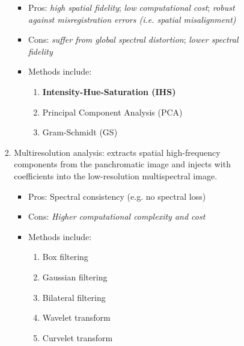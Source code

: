 \begin{itemize}
\begin{itemize}
\begin{itemize}
\begin{enumerate}
                                \begin{itemize}
                                    \item Pros: \textit{high spatial fidelity}; \textit{low computational cost}; \textit{robust against misregistration errors (i.e. spatial misalignment)}
                                    \item Cons: \textit{suffer from global spectral distortion}; \textit{lower spectral fidelity}
                                    \item Methods include:
                                    \begin{enumerate}
                                        \item \textbf{Intensity-Hue-Saturation (IHS)}
                                        \item Principal Component Analysis (PCA)
                                        \item Gram-Schmidt (GS)
                                    \end{enumerate}
                                \end{itemize}
                            \item Multiresolution analysis: extracts spatial high-frequency components from the panchromatic image and injects with coefficients into the low-resolution multispectral image.
                                \begin{itemize}
                                    \item Pros: Spectral consistency (e.g. no spectral loss)
                                    \item Cons: \textit{Higher computational complexity and cost}
                                    \item Methods include:
                                    \begin{enumerate}
                                        \item Box filtering
                                        \item Gaussian filtering
                                        \item Bilateral filtering
                                        \item Wavelet transform
                                        \item Curvelet transform
                                    \end{enumerate}

\end{itemize}
\end{enumerate}
\end{itemize}
\end{itemize}
\end{itemize}
